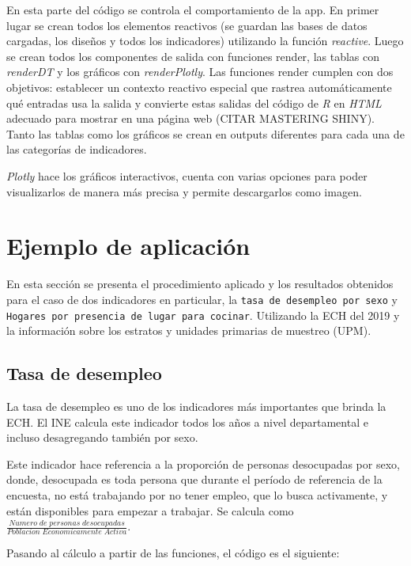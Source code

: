 \documentclass[12pt,twoside,spanish,a4paper]{book}\usepackage[]{graphicx}\usepackage[]{color}
\begin{document}
En esta parte del código se controla el comportamiento de la app. En primer lugar se crean todos los elementos reactivos (se guardan las bases de datos cargadas, los diseños y todos los indicadores) utilizando la función \textit{reactive}. Luego se crean todos los componentes de salida con funciones render, las tablas con \textit{renderDT} y los gráficos con \textit{renderPlotly}. Las funciones render cumplen con dos objetivos: establecer un contexto reactivo especial que rastrea automáticamente qué entradas usa la salida y convierte estas salidas del código de \emph{R} en \emph{HTML} adecuado para mostrar en una página web (CITAR MASTERING SHINY). Tanto las tablas como los gráficos se crean en outputs diferentes para cada una de las categorías de indicadores.

\textit{Plotly} \citep{plotly} hace los gráficos interactivos, cuenta con varias opciones para poder visualizarlos de manera más precisa y permite descargarlos como imagen.

\chapter{Ejemplo de aplicación \label{cap:aplic}}

En esta sección se presenta el procedimiento aplicado y los resultados obtenidos para el caso de dos indicadores en particular, la \texttt{tasa de desempleo por sexo} y \texttt{Hogares por presencia de lugar para cocinar}. Utilizando la ECH del 2019 y la información sobre los estratos y unidades primarias de muestreo (UPM).

\section{Tasa de desempleo \label{sec:desempleo}}

La tasa de desempleo es uno de los indicadores más importantes que brinda la ECH. El INE calcula este indicador todos los años a nivel departamental e incluso desagregando también por sexo.

Este indicador hace referencia a la proporción de personas desocupadas por sexo, donde, desocupada es toda persona que durante el período de referencia de la encuesta, no está trabajando por no tener empleo, que lo busca activamente, y están disponibles para empezar a trabajar. Se calcula como $\frac{Numero\; de\; personas\; desocupadas}{Poblacion \;Economicamente \;Activa}$.

Pasando al cálculo a partir de las funciones, el código es el siguiente:
\end{document}
